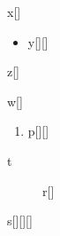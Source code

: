 \documentclass{article}
\begin{document}
\makeatletter
\begin{list}{}{}\item x[\the\@listdepth] \begin{itemize}\item y[\the\@listdepth][\the\@itemdepth]\end{itemize} z[\the\@listdepth]\end{list}
w[\the\@listdepth]
\begin{enumerate}\item p[\the\@listdepth][\the\@enumdepth] \end{enumerate}
\begin{description}\item[t] r[\the\@listdepth]\end{description}
s[\the\@listdepth][\the\@itemdepth][\the\@enumdepth]
\makeatother
\end{document}
